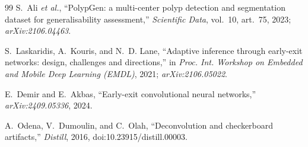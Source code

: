 \documentclass[journal]{IEEEtran}
\begin{document}
\begin{thebibliography}{99}
S.~Ali \emph{et al.}, ``PolypGen: a multi-center polyp detection and segmentation dataset for generalisability assessment,'' \emph{Scientific Data}, vol.~10, art.~75, 2023; \emph{arXiv:2106.04463}.

S.~Laskaridis, A.~Kouris, and N.~D. Lane, ``Adaptive inference through early-exit networks: design, challenges and directions,'' in \emph{Proc. Int. Workshop on Embedded and Mobile Deep Learning (EMDL)}, 2021; \emph{arXiv:2106.05022}.

E.~Demir and E.~Akbas, ``Early-exit convolutional neural networks,'' \emph{arXiv:2409.05336}, 2024.

A.~Odena, V.~Dumoulin, and C.~Olah, ``Deconvolution and checkerboard artifacts,'' \emph{Distill}, 2016, doi:10.23915/distill.00003.

\end{thebibliography}
\end{document}
